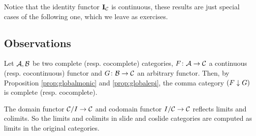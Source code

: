 Notice that the identity functor $\operatorname{\mathbf{I}}_{{\cal C}}$ is continuous, these results are just special cases of the following one, which we leave as exercises.
\subsection{Observations}
  \begin{ex}
    Let ${\cal A},{\cal B}$ be two complete (resp. cocomplete) categories, $F\colon{\cal A}\to{\cal C}$ a continuous (resp. cocontinuous)  functor and $G\colon{\cal B}\to{\cal C}$ an arbitrary functor. Then, by Proposition \ref{prop:globalmonic} and \ref{prop:globalepi}, the comma category $(F \downarrow G)$ is complete (resp. cocomplete). %
  \end{ex}
  \begin{ex}
    The domain functor ${\cal C}/I\to{\cal C}$ and codomain functor $I/{\cal C}\to{\cal C}$ reflects limits and colimits. So the limits and colimits in slide and coslide categories are computed as limits in the original categories.
  \end{ex}

